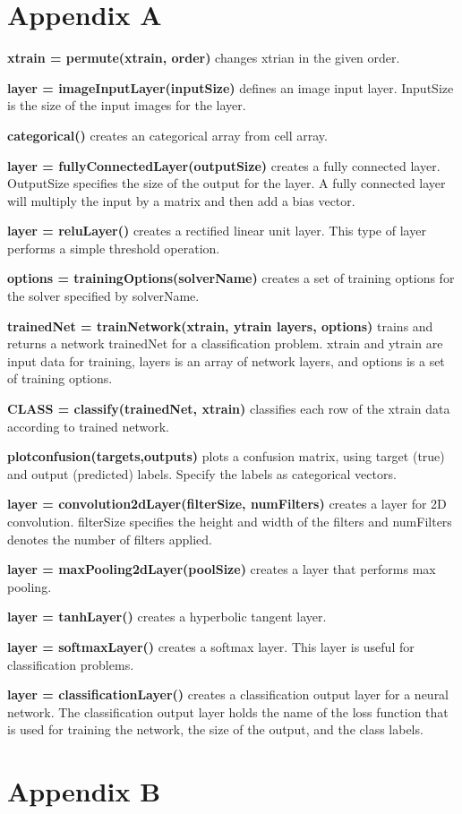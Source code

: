\documentclass[10pt]{article}
\begin{document}
\section{Appendix A}
\noindent
\textbf{xtrain = permute(xtrain, order)} changes xtrian in the given order.
\par
\vskip 0.2cm
\noindent
\textbf{layer = imageInputLayer(inputSize)} defines an image input layer. InputSize is the size of the input images for the layer.
\par
\vskip 0.2cm
\noindent
\textbf{categorical()} creates an categorical array from cell array.
\par
\vskip 0.2cm
\noindent
\textbf{layer = fullyConnectedLayer(outputSize)} creates a fully connected
    layer. OutputSize specifies the size of the output for the layer. A
    fully connected layer will multiply the input by a matrix and then add
    a bias vector.
\par
\vskip 0.2cm
\noindent
\textbf{layer = reluLayer()} creates a rectified linear unit layer. This type of
    layer performs a simple threshold operation.
\par
\vskip 0.2cm
\noindent
\textbf{options = trainingOptions(solverName)} creates a set of training options
    for the solver specified by solverName.
\par
\vskip 0.2cm
\noindent
\textbf{trainedNet = trainNetwork(xtrain, ytrain layers, options)} trains and returns a
    network trainedNet for a classification problem. xtrain and ytrain are input data for training, layers is an array of network
    layers, and options is a set of training options.
\par
\vskip 0.2cm
\noindent
\textbf{CLASS = classify(trainedNet, xtrain)} classifies each row of the xtrain data according to trained network.
\par
\vskip 0.2cm
\noindent
\textbf{plotconfusion(targets,outputs)} plots a confusion matrix, using target
  (true) and output (predicted) labels. Specify the labels as categorical
  vectors.
  \par
\vskip 0.2cm
\noindent
\textbf{layer = convolution2dLayer(filterSize, numFilters)} creates a layer
    for 2D convolution. filterSize specifies the height and width of the
    filters and numFilters denotes the number of filters applied.
     \par
\vskip 0.2cm
\noindent
\textbf{layer = maxPooling2dLayer(poolSize)} creates a layer that performs max
    pooling.
         \par
\vskip 0.2cm
\noindent
\textbf{layer = tanhLayer()} creates a hyperbolic tangent layer.
\par
\vskip 0.2cm
\noindent
\textbf{layer = softmaxLayer()} creates a softmax layer. This layer is
    useful for classification problems.
    \par
\vskip 0.2cm
\noindent
\textbf{layer = classificationLayer()} creates a classification output layer for
    a neural network. The classification output layer holds the name of the
    loss function that is used for training the network, the size of the
    output, and the class labels.






\newpage

\section{Appendix B}

\end{document}
